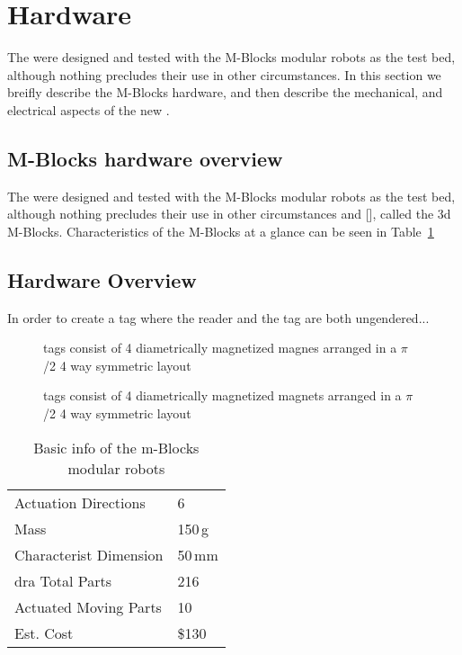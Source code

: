 \section{Hardware}
\label{sec:Hardware}

The \tagNamePlural were designed and tested with the M-Blocks modular robots as the test bed, although nothing precludes their use in other circumstances. In this section we breifly describe the M-Blocks hardware, and then describe the mechanical, and electrical aspects of the new \tagNamePlural.

\subsection{M-Blocks hardware overview}
\label{sec:mblocksOverview}

The \tagName were designed and tested with the M-Blocks modular robots as the test bed, although nothing precludes their use in other circumstances and [], called the 3d M-Blocks. Characteristics of the M-Blocks at a glance can be seen in Table~\ref{tab:hardwareOverview}

\subsection{\tagNamePlural Hardware Overview}
\label{sec:tagsOverview}
In order to create a tag where the reader and the tag are both ungendered...





\begin{figure}[b]
	
	\caption{tags consist of 4 diametrically magnetized
	magnes arranged in a $\pi$ /2 4 way symmetric layout}
	\label{fig:tagDiagram}
\end{figure}

\begin{figure}[b]
	
	\caption{tags consist of 4 diametrically magnetized
		magnets arranged in a $\pi$/2 4 way symmetric layout}
	\label{fig:tagDiagram}
\end{figure}

\begin{table}[b]
  \caption{Basic info of the m-Blocks modular robots}

  \begin{tabular}{ p{3.4cm}  p{1.9cm} }
    \hline
    Actuation Directions & 6 \\
    Mass  & 150\,g \\
    Characterist Dimension & 50\,mm \\dra
    Total Parts  & 216 \\
    Actuated Moving Parts  & 10 \\
    Est. Cost & \$130 \\

  \end{tabular}

    \label{tab:hardwareOverview}
\end{table}



